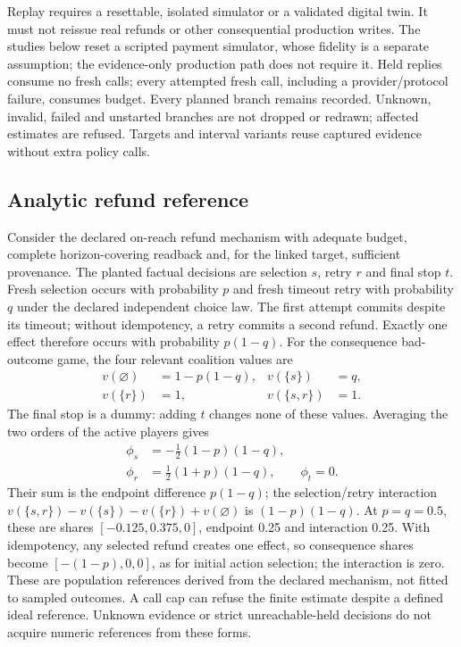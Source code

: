 \documentclass[conference]{IEEEtran}
\begin{document}
Replay requires a resettable, isolated simulator or a validated digital twin.
It must not reissue real refunds or other consequential production writes.
The studies below reset a scripted payment simulator, whose fidelity is a
separate assumption; the evidence-only production path does not require it.
Held replies consume no fresh calls;
every attempted fresh call, including a provider/protocol failure, consumes
budget. Every planned branch remains recorded. Unknown, invalid, failed and
unstarted branches are not dropped or redrawn; affected estimates are refused.
Targets and interval variants reuse captured evidence without extra policy calls.

\subsection{Analytic refund reference}
Consider the declared on-reach refund mechanism with adequate budget, complete
horizon-covering readback and, for the linked target, sufficient provenance.
The planted factual decisions are selection $s$, retry $r$ and final stop $t$.
Fresh selection occurs with probability $p$ and fresh timeout retry with
probability $q$ under the declared independent choice law. The first attempt
commits despite its timeout; without idempotency, a retry commits a second
refund. Exactly one effect therefore occurs with probability $p(1-q)$.
For the consequence bad-outcome game, the four relevant coalition values are
\begin{equation}
\begin{aligned}
v(\varnothing)&=1-p(1-q), & v(\{s\})&=q,\\
v(\{r\})&=1, & v(\{s,r\})&=1.
\end{aligned}
\end{equation}
The final stop is a dummy: adding $t$ changes none of these values. Averaging
the two orders of the active players gives
\begin{equation}
\begin{aligned}
\phi_s&=-\tfrac12(1-p)(1-q),\\
\phi_r&=\tfrac12(1+p)(1-q),\qquad \phi_t=0.
\end{aligned}
\end{equation}
Their sum is the endpoint difference $p(1-q)$; the selection/retry interaction
$v(\{s,r\})-v(\{s\})-v(\{r\})+v(\varnothing)$ is $(1-p)(1-q)$.
At $p=q=0.5$, these are shares $[-0.125,0.375,0]$, endpoint 0.25 and
interaction 0.25. With idempotency, any selected refund creates one effect,
so consequence shares become $[-(1-p),0,0]$, as for initial action selection;
the interaction is zero. These are population references derived from the
declared mechanism, not fitted to sampled outcomes. A call cap can refuse the
finite estimate despite a defined ideal reference. Unknown evidence or strict
unreachable-held decisions do not acquire numeric references from these forms.
\end{document}
